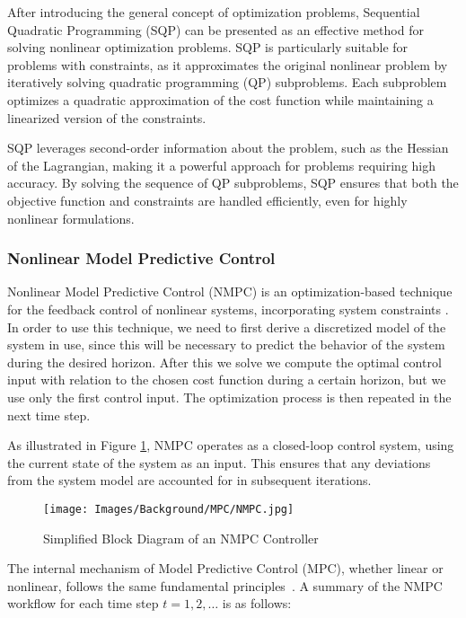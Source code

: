 After introducing the general concept of optimization problems, Sequential Quadratic Programming (SQP) can be presented as an effective method for solving nonlinear optimization problems. SQP is particularly suitable for problems with constraints, as it approximates the original nonlinear problem by iteratively solving quadratic programming (QP) subproblems. Each subproblem optimizes a quadratic approximation of the cost function while maintaining a linearized version of the constraints.

SQP leverages second-order information about the problem, such as the Hessian of the Lagrangian, making it a powerful approach for problems requiring high accuracy. By solving the sequence of QP subproblems, SQP ensures that both the objective function and constraints are handled efficiently, even for highly nonlinear formulations.

\subsubsection{Nonlinear Model Predictive Control}

Nonlinear Model Predictive Control (NMPC) is an optimization-based technique for the feedback control of nonlinear systems, incorporating system constraints \cite{grune2017nonlinearmpc}. In order to use this technique, we need to first derive a discretized model of the system in use, since this will be necessary to predict the behavior of the system during the desired horizon. After this we solve we compute the optimal control input with relation to the chosen cost function during a certain horizon, but we use only the first control input. The optimization process is then repeated in the next time step.

As illustrated in Figure \ref{fig:simplified_mpc_control_loop}, NMPC operates as a closed-loop control system, using the current state of the system as an input. This ensures that any deviations from the system model are accounted for in subsequent iterations.

\begin{figure}[h]
    \centering
    \texttt{[image: Images/Background/MPC/NMPC.jpg]}
    \caption{Simplified Block Diagram of an NMPC Controller}
    \label{fig:simplified_mpc_control_loop}
\end{figure}

The internal mechanism of Model Predictive Control (MPC), whether linear or nonlinear, follows the same fundamental principles~\cite{grune2017nonlinearmpc,schwenzer2021review}. 
A summary of the NMPC workflow for each time step \( t = 1, 2, \dots \) is as follows:


